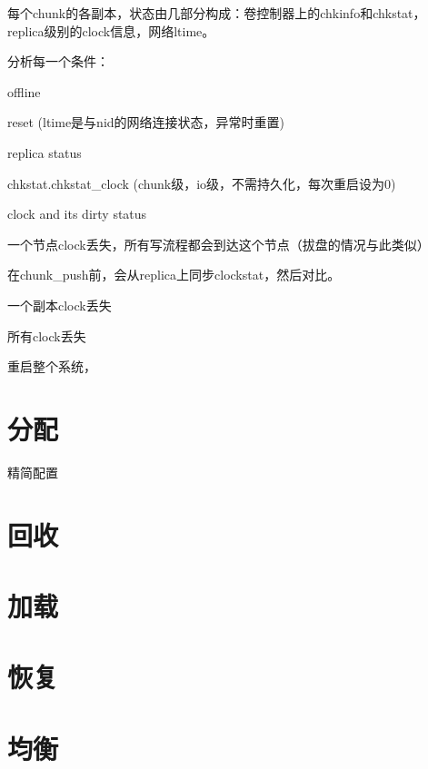 每个chunk的各副本，状态由几部分构成：卷控制器上的chkinfo和chkstat，
replica级别的clock信息，网络ltime。

分析每一个条件：
\begin{compactenum}
\item offline
\item reset (ltime是与nid的网络连接状态，异常时重置)
\item replica status
\item chkstat.chkstat\_clock (chunk级，io级，不需持久化，每次重启设为0)
\item clock and its dirty status
\end{compactenum}

一个节点clock丢失，所有写流程都会到达这个节点（拔盘的情况与此类似）

在chunk\_push前，会从replica上同步clockstat，然后对比。

一个副本clock丢失

所有clock丢失

重启整个系统，

\section{分配}

精简配置

\section{回收}

\section{加载}

\section{恢复}

\section{均衡}
